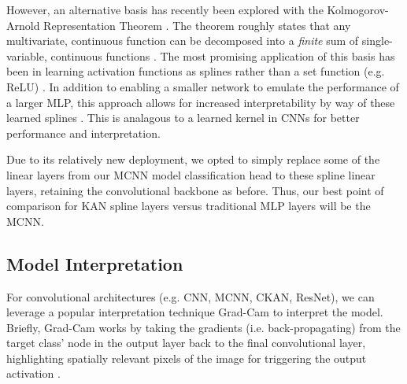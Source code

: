 \documentclass[conference]{IEEEtran}
\begin{document}
However, an alternative basis has recently been explored with the Kolmogorov-Arnold Representation Theorem \cite{kan}. The theorem roughly states that any multivariate, continuous function can be decomposed into a \textit{finite} sum of single-variable, continuous functions \cite{kan_approx_thm}. The most promising application of this basis has been in learning activation functions as splines rather than a set function (e.g. ReLU) \cite{kan}. In addition to enabling a smaller network to emulate the performance of a larger MLP, this approach allows for increased interpretability by way of these learned splines \cite{kan}. This is analagous to a learned kernel in CNNs for better performance and interpretation.

Due to its relatively new deployment, we opted to simply replace some of the linear layers from our MCNN model classification head to these spline linear layers, retaining the convolutional backbone as before. Thus, our best point of comparison for KAN spline layers versus traditional MLP layers will be the MCNN.


\subsection{Model Interpretation}
For convolutional architectures (e.g. CNN, MCNN, CKAN, ResNet), we can leverage a popular interpretation technique Grad-Cam to interpret the model. Briefly, Grad-Cam works by taking the gradients (i.e. back-propagating) from the target class' node in the output layer back to the final convolutional layer, highlighting spatially relevant pixels of the image for triggering the output activation \cite{gradcam}.
\end{document}

